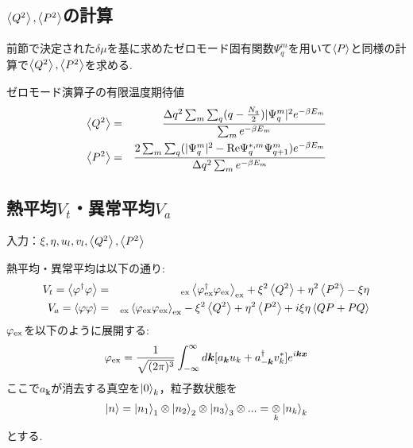 \documentclass[10.5pt,a4paper]{jreport}
\begin{document}
\subsection{$\ev{Q^2},\ev{P^2}$の計算}

前節で決定された$\delta \mu$を基に求めたゼロモード固有関数$\Psi^m_q$を用いて$\ev{P}$と同様の計算で$\ev{Q^2},\ev{P^2}$を求める.
\begin{itembox}[c]{ゼロモード演算子の有限温度期待値}
\begin{eqnarray}
  \ev{Q^2}&=& \frac{\Delta q^2\sum_m\sum_q(q - \frac{N_q}{2})|\Psi_q^m|^2e^{-\beta E_m}}{\sum_me^{-\beta E_m}}\\
  \ev{P^2}&=& \frac{2\sum_m\sum_q(|\Psi_q^m|^2-{\rm Re}\Psi_q^{*,m}\Psi_{q+1}^m)e^{-\beta E_m}}{\Delta q^2\sum_me^{-\beta E_m}}
\end{eqnarray}
\end{itembox}

\subsection{熱平均$V_t$・異常平均$V_a$}
入力：$\xi, \eta, u_l, v_l, \ev{Q^2}, \ev{P^2}$

熱平均・異常平均は以下の通り:
\begin{eqnarray}
  V_t = \ev{\varphi^\dagger\varphi} &=& _{{\rm ex}}\ev{\varphi^\dagger_{{\rm ex}}\varphi_{{\rm ex}}}_{{\rm ex}} + \xi^2\ev{Q^2} + \eta^2\ev{P^2} -\xi\eta \\
  V_a = \ev{\varphi\varphi} &=& _{{\rm ex}}\ev{\varphi_{{\rm ex}}\varphi_{{\rm ex}}}_{{\rm ex}} - \xi^2\ev{Q^2} + \eta^2\ev{P^2} + i\xi\eta\ev{QP+PQ} 
\end{eqnarray}
$\varphi_{\rm ex}$を以下のように展開する:
\begin{eqnarray}
  \varphi_{\rm ex} = \frac{1}{\sqrt{(2\pi)^3}}\int^{\infty}_{-\infty} d\bm{k}[a_{\bm{k}}u_k + a^\dagger_{-\bm{k}} v_k^*]e^{i\bm{k}\bm{x}}
\end{eqnarray}
ここで$a_{\bm{k}}$が消去する真空を$\ket{0}_k$，粒子数状態を
\begin{eqnarray}
  \ket{n} = \ket{n_1}_1\otimes\ket{n_2}_2\otimes\ket{n_3}_3\otimes... = \underset{k}{\otimes}\ket{n_k}_k
\end{eqnarray}
とする.
\end{document}
